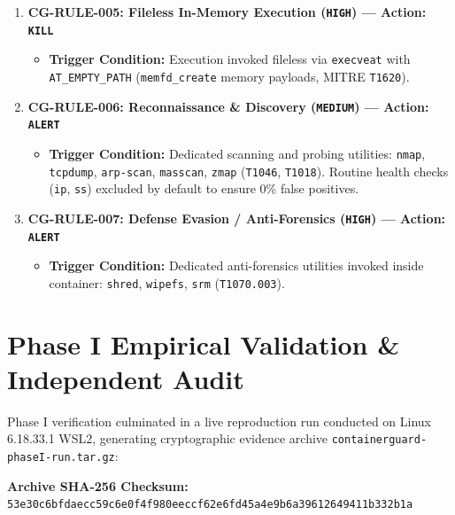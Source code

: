 \documentclass[11pt,a4paper]{article}
\begin{document}
\begin{enumerate}
\begin{itemize}
    \end{itemize}
    \item \textbf{CG-RULE-005: Fileless In-Memory Execution (\texttt{HIGH}) --- Action: \texttt{KILL}}
    \begin{itemize}
        \item \textbf{Trigger Condition:} Execution invoked fileless via \texttt{execveat} with \texttt{AT\_EMPTY\_PATH} (\texttt{memfd\_create} memory payloads, MITRE \texttt{T1620}).
    \end{itemize}
    \item \textbf{CG-RULE-006: Reconnaissance \& Discovery (\texttt{MEDIUM}) --- Action: \texttt{ALERT}}
    \begin{itemize}
        \item \textbf{Trigger Condition:} Dedicated scanning and probing utilities: \texttt{nmap}, \texttt{tcpdump}, \texttt{arp-scan}, \texttt{masscan}, \texttt{zmap} (\texttt{T1046}, \texttt{T1018}). Routine health checks (\texttt{ip}, \texttt{ss}) excluded by default to ensure 0\% false positives.
    \end{itemize}
    \item \textbf{CG-RULE-007: Defense Evasion / Anti-Forensics (\texttt{HIGH}) --- Action: \texttt{ALERT}}
    \begin{itemize}
        \item \textbf{Trigger Condition:} Dedicated anti-forensics utilities invoked inside container: \texttt{shred}, \texttt{wipefs}, \texttt{srm} (\texttt{T1070.003}).
    \end{itemize}
\end{enumerate}

\newpage


\section{Phase I Empirical Validation \& Independent Audit}

Phase I verification culminated in a live reproduction run conducted on Linux 6.18.33.1 WSL2, generating cryptographic evidence archive \texttt{containerguard-phaseI-run.tar.gz}:

\begin{center}
\small\textbf{Archive SHA-256 Checksum:}\\
\texttt{53e30c6bfdaecc59c6e0f4f980eeccf62e6fd45a4e9b6a39612649411b332b1a}
\end{center}
\end{document}
